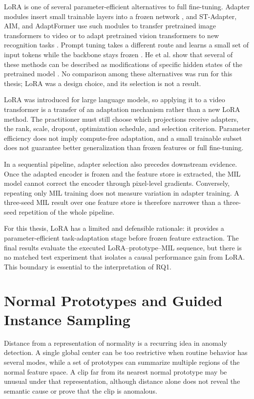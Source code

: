 LoRA is one of several parameter-efficient alternatives to full fine-tuning.
Adapter modules insert small trainable layers into a frozen network
\cite{houlsby2019parameter}, and ST-Adapter, AIM, and AdaptFormer use such
modules to transfer pretrained image transformers to video or to adapt
pretrained vision transformers to new recognition tasks
\cite{pan2022st,yang2023aim,chen2022adaptformer}. Prompt tuning takes a
different route and learns a small set of input tokens while the backbone stays
frozen \cite{lester2021power,jia2022visual}. He et al. show that several of
these methods can be described as modifications of specific hidden states of
the pretrained model \cite{he2022towards}. No comparison among these
alternatives was run for this thesis; LoRA was a design choice, and its
selection is not a result.

LoRA was introduced for large language models, so applying it to a video
transformer is a transfer of an adaptation mechanism rather than a new LoRA
method. The practitioner must still choose which projections receive adapters, the rank,
scale, dropout, optimization schedule, and selection criterion. Parameter
efficiency does not imply compute-free adaptation, and a small trainable subset
does not guarantee better generalization than frozen features or full
fine-tuning.

In a sequential pipeline, adapter selection also precedes downstream evidence.
Once the adapted encoder is frozen and the feature store is extracted, the MIL
model cannot correct the encoder through pixel-level gradients. Conversely,
repeating only MIL training does not measure variation in adapter training. A
three-seed MIL result over one feature store is therefore narrower than a
three-seed repetition of the whole pipeline.

For this thesis, LoRA has a limited and defensible rationale: it provides a
parameter-efficient task-adaptation stage before frozen feature extraction. The
final results evaluate the executed LoRA--prototype--MIL sequence, but there is
no matched test experiment that isolates a causal performance gain from LoRA.
This boundary is essential to the interpretation of RQ1.

\section{Normal Prototypes and Guided Instance Sampling}
\label{sec:background-prototypes}

Distance from a representation of normality is a recurring idea in anomaly
detection. A single global center can be too restrictive when routine behavior
has several modes, while a set of prototypes can summarize multiple regions of
the normal feature space. A clip far from its nearest normal prototype may be
unusual under that representation, although distance alone does not reveal the
semantic cause or prove that the clip is anomalous.

